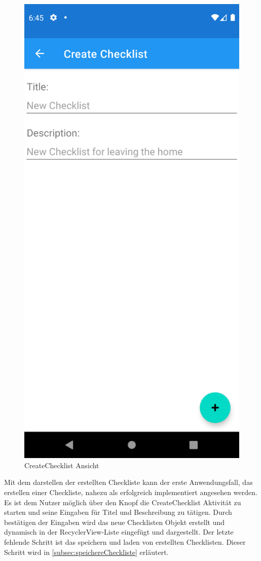 \begin{figure}[h]
\begin{minipage}{0.45\linewidth}
		\centering
		\includegraphics[width=.9\linewidth]{Bilder/CreateChecklist.png}
		\caption{CreateChecklist Ansicht}
		\label{fig:createChecklist}
	\end{minipage}
\end{figure}

Mit dem darstellen der erstellten Checkliste kann der erste Anwendungsfall, das erstellen einer Checkliste, nahezu als erfolgreich implementiert angesehen werden. Es ist dem Nutzer möglich über den Knopf die CreateChecklist Aktivität zu starten und seine Eingaben für Titel und Beschreibung zu tätigen. Durch bestätigen der Eingaben wird das neue Checklisten Objekt erstellt und dynamisch in der RecyclerView-Liste eingefügt und dargestellt. Der letzte fehlende Schritt ist das speichern und laden von erstellten Checklisten. Dieser Schritt wird in \autoref{subsec:speichereCheckliste} erläutert.

